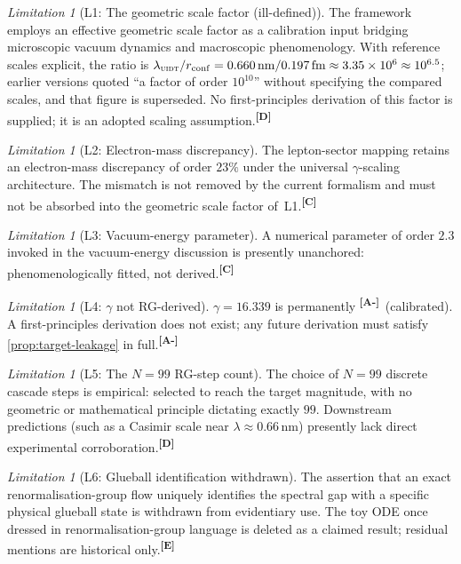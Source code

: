 \documentclass[12pt,a4paper,twoside]{article}
\theoremstyle{plain}
\theoremstyle{definition}
\theoremstyle{remark}
\newtheorem{limitation}[theorem]{Limitation}
\newcommand{\UIDT}{\textsc{uidt}} %
\newcommand{\catmark}[1]{\textsuperscript{\textsf{\textbf{[#1]}}}}
\newcommand{\GammaGeom}{16.339} %
\begin{document}
\begin{limitation}[L1: The geometric scale factor (ill-defined)]
\label{lim:L1}
The framework employs an effective geometric scale factor as a
calibration input bridging microscopic vacuum dynamics and macroscopic
phenomenology. With reference scales explicit, the ratio is
$\lambda_{\UIDT}/r_{\mathrm{conf}} =
0.660\,\mathrm{nm}/0.197\,\mathrm{fm} \approx 3.35\times10^{6} \approx
10^{6.5}$; earlier versions quoted ``a factor of order $10^{10}$''
without specifying the compared scales, and that figure is superseded.
No first-principles derivation of this factor is supplied; it is an
adopted scaling assumption.\catmark{D}
\end{limitation}

\begin{limitation}[L2: Electron-mass discrepancy]
\label{lim:L2}
The lepton-sector mapping retains an electron-mass discrepancy of order
$23\%$ under the universal $\gamma$-scaling architecture. The mismatch
is not removed by the current formalism and must not be absorbed into
the geometric scale factor of~L1.\catmark{C}
\end{limitation}

\begin{limitation}[L3: Vacuum-energy parameter]
\label{lim:L3}
A numerical parameter of order $2.3$ invoked in the vacuum-energy
discussion is presently unanchored: phenomenologically fitted, not
derived.\catmark{C}
\end{limitation}

\begin{limitation}[L4: $\gamma$ not RG-derived]
\label{lim:L4}
$\gamma = \GammaGeom$ is permanently \catmark{A-}\ (calibrated). A
first-principles derivation does not exist; any future derivation must
satisfy \cref{prop:target-leakage} in full.\catmark{A-}
\end{limitation}

\begin{limitation}[L5: The $N=99$ RG-step count]
\label{lim:L5}
The choice of $N=99$ discrete cascade steps is empirical: selected to
reach the target magnitude, with no geometric or mathematical principle
dictating exactly $99$. Downstream predictions (such as a Casimir scale
near $\lambda \approx 0.66\,\mathrm{nm}$) presently lack direct
experimental corroboration.\catmark{D}
\end{limitation}

\begin{limitation}[L6: Glueball identification withdrawn]
\label{lim:L6}
The assertion that an exact renormalisation-group flow uniquely
identifies the spectral gap with a specific physical glueball state is
withdrawn from evidentiary use. The toy ODE once dressed in
renormalisation-group language is deleted as a claimed result; residual
mentions are historical only.\catmark{E}
\end{limitation}
\end{document}
